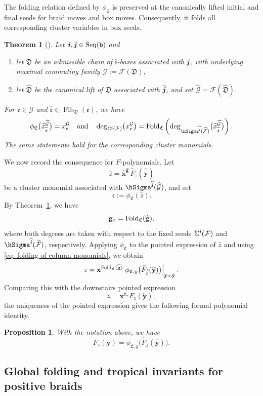 \documentclass[12pt, leqno]{amsart}
\numberwithin{equation}{section}
\theoremstyle{plain}
\newtheorem{proposition}[lemma]{Proposition}
\newtheorem{theorem}[lemma]{Theorem}
\theoremstyle{definition}
\newcommand{\seteq}{\mathbin{:=}}
\newcommand{\Fold}{{\rm Fold}}
\newcommand{\ii}{ \textbf{\textit{i}}}
\newcommand{\jj}{ \textbf{\textit{j}}}
\newcommand{\Fib}{\operatorname{Fib}}
\newcommand{\hF}{\widehat{F}}
\newcommand{\hx}{\widehat{x}}
\newcommand{\hz}{\widehat{z}}
\newcommand{\hii}{{\widehat{\ii}}}
\newcommand{\hjj}{{\widehat{\jj}}}
\newcommand{\frakC}{\mathfrak{C}}
\newcommand{\frakD}{\mathfrak{D}}
\newcommand{\frake}{\mathfrak{e}}
\newcommand{\hfrake}{\widehat{\frake}}
\newcommand{\hfrakD}{\widehat{\frakD}}
\newcommand{\hbfx}{\widehat{\bfx}}
\newcommand{\dbfy}{\dot{\bfy}}
\newcommand{\hdbfy}{\widehat{\dbfy}}
\newcommand{\hbfg}{\widehat{\bfg}}
\newcommand{\bfg}{\mathbf{g}}
\newcommand{\bfi}{\mathbf{i}}
\newcommand{\bfx}{\mathbf{x}}
\newcommand{\bfy}{\mathbf{y}}
\newcommand{\calF}{\mathcal{F}}
\newcommand{\calG}{\mathcal{G}}
\newcommand{\hcalF}{{\widehat{\calF}}}
\newcommand{\hcalG}{{\widehat{\calG}}}
\newcommand{\ttb}{\mathtt{b}}
\newcommand{\qtq}[1][{and}]{\quad\text{{#1}}\quad}
\newcommand{\ee}{\end{enumerate}}
\newcommand{\bnum}{\begin{enumerate}[{\rm (i)}]}
\newcommand{\Seq}{\mathrm{Seq}}
\begin{document}
The folding relation defined by \(\phi_{\frakC}\) is preserved at
the canonically lifted initial and final seeds for braid moves
and box moves.
Consequently, it folds all corresponding cluster variables in box seeds.

\begin{theorem}[{\cite[Theorem~6.2 and Corollary~6.3]{JO26}}]
\label{thm: folding of box cluster variables}
Let \(\ii,\jj\in\Seq(\ttb)\) and 
\bnum
\item let \(\frakD\) be an admissible chain of \(\bfi\)-boxes
associated with \(\jj\), with underlying maximal commuting family
\(\calG\seteq\calF(\frakD)\),
\item  let \(\hfrakD\) be the canonical lift of \(\frakD\) associated
with \(\hjj\), and set \(\hcalG=\calF(\hfrakD)\).  
\ee 
For \(\frake\in\calG\) and \(\hfrake\in\Fib_{\frakD}(\frake)\), we have
\[
\phi_{\frakC} \bigl(\hx_{\hfrake}^{\hcalG}\bigr) = x_\frake^\calG
\qtq
\deg_{\Sigma^\ii(\calF)} \bigl(x_\frake^\calG\bigr) = \Fold_{\frakC}\left( \deg_{\hSigma^\hii(\hcalF)} \bigl(\hx_{\hfrake}^{\hcalG}\bigr) \right).
\]
The same statements hold for the corresponding cluster monomials.
\end{theorem}

We now record the consequence for \(F\)-polynomials.  Let 
\[
\hz = \hbfx^{\hbfg}\, \hF_{\hz}(\hdbfy)
\]
be a cluster monomial associated with
\(\hSigma^\hjj(\hcalG)\), and set 
\[
z\seteq\phi_{\frakC}(\hz).
\]
By Theorem~\ref{thm: folding of box cluster variables}, we have
\[
\bfg_z=\Fold_{\frakC}(\hbfg),
\]
where both degrees are taken with respect to the fixed seeds
\(\Sigma^\ii(\calF)\) and \(\hSigma^\hii(\hcalF)\), respectively.
Applying \(\phi_{\frakC}\) to the pointed expression of
\(\hz\) and using
\eqref{eq: folding of column monomials}, we obtain
\[
z = \bfx^{\Fold_{\frakC}(\hbfg)} \left. \phi_{\frakC,y}\bigl( \hF_{\hz}(\widehat{\bfy}) \bigr)  \right|_{\bfy=\dbfy}.
\]
Comparing this with the downstairs pointed expression
\[
z=\bfx^{\bfg_z}F_z(\dbfy),
\]
the uniqueness of the pointed expression gives the following formal
polynomial identity.

\begin{proposition}\label{prop: folding of pointed F-parts}
With the notation above, we have 
\[
F_z(\bfy) = \phi_{\frakC,y}\bigl( \hF_{\hz}(\widehat{\bfy}) \bigr). 
\]
\end{proposition}

\subsection{Global folding and tropical invariants for positive braids}
\label{subsec: global folding for positive braids}
 
\end{document}
